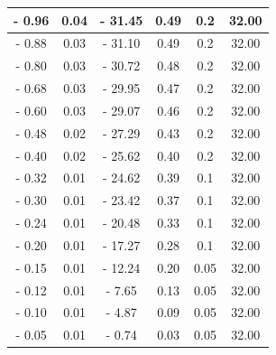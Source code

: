 \documentclass[a4paper, 11pt]{article}
\begin{document}
\begin{longtable}{|c|c|c|c|c|c|}
        \hline
        - 0.96 & 0.04 & - 31.45 & 0.49 & 0.2 & 32.00 \\
        \hline 
        - 0.88 & 0.03 & - 31.10 & 0.49 & 0.2 & 32.00 \\
        \hline
        - 0.80 & 0.03 & - 30.72 & 0.48 & 0.2 & 32.00 \\
        \hline 
        - 0.68 & 0.03 & - 29.95 & 0.47 & 0.2 & 32.00 \\
        \hline 
        - 0.60 & 0.03 & - 29.07 & 0.46 & 0.2 & 32.00 \\
        \hline 
        - 0.48 & 0.02 & - 27.29 & 0.43 & 0.2 & 32.00 \\
        \hline
        - 0.40 & 0.02 & - 25.62 & 0.40 & 0.2 & 32.00 \\
        \hline 
        - 0.32 & 0.01 & - 24.62 & 0.39 & 0.1 & 32.00 \\
        \hline 
        - 0.30 & 0.01 & - 23.42 & 0.37 & 0.1 & 32.00 \\
        \hline 
        - 0.24 & 0.01 & - 20.48 & 0.33 & 0.1 & 32.00 \\
        \hline 
        - 0.20 & 0.01 & - 17.27 & 0.28 & 0.1 & 32.00 \\
        \hline 
        - 0.15 & 0.01 & - 12.24 & 0.20 & 0.05 & 32.00 \\
        \hline 
        - 0.12 & 0.01 & - 7.65 & 0.13 &	0.05 & 32.00 \\
        \hline 
        - 0.10 & 0.01 & - 4.87 & 0.09 &	0.05 & 32.00 \\
        \hline 
        - 0.05 & 0.01 & - 0.74 & 0.03 &	0.05 & 32.00 \\
\end{longtable}
\end{document}

